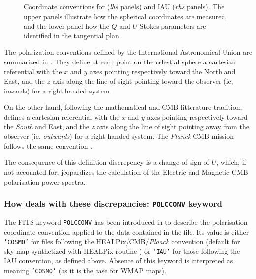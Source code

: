 \documentclass[12pt,twoside]{article}
\begin{document}
\begin{figure}[!ht]
\caption[Coordinate conventions]%
{\label{fig:reftqu}%
\label{intro:fig:reftqu}%
Coordinate conventions for \healpix ({\em lhs} panels) and IAU ({\em rhs} panels). The
  upper panels illustrate how the spherical coordinates are measured, and the
  lower panel how the $Q$ and $U$ Stokes parameters are identified in the
  tangential plan.
}
\end{figure}

The polarization conventions defined by the International Astronomical Union
\citep{iau74} are summarized in \cite{hambreg}. They define at each point on the
celestial sphere a cartesian referential with the $x$ and $y$ axes pointing
respectively toward the North and East, and the $z$
axis along the line of sight pointing toward the observer (ie, inwards) for a
right-handed system.

On the other hand, following the mathematical and CMB litterature tradition,
\healpix defines a cartesian referential with the $x$ and $y$ axes pointing
respectively toward the {\em South} and East, and the $z$ axis along the line of sight
pointing away from the observer (ie, {\em outwards}) for a right-handed
system. The {\em Planck} CMB mission follows the same convention \citep{ansari}.

The consequence of this definition discrepency is a change of sign of $U$,
which, if not accounted for, jeopardizes the calculation of the Electric and Magnetic  CMB
polarisation power spectra.

\subsubsection{How \healpix deals with these discrepancies: \texttt{POLCCONV} keyword}
\label{intro:polcconv}
The FITS keyword \texttt{POLCCONV} has been introduced in  to describe the
polarisation coordinate convention applied to the data contained in the file. 
Its value is either \texttt{'COSMO'} for files following the HEALPix/CMB/{\em Planck} convention 
(default for sky map synthetized with HEALPix routine )
or \texttt{'IAU'} for those
following the IAU convention, as defined above. Absence of this keyword is
interpreted as meaning \texttt{'COSMO'} (as it is the case for WMAP maps).
\end{document}
